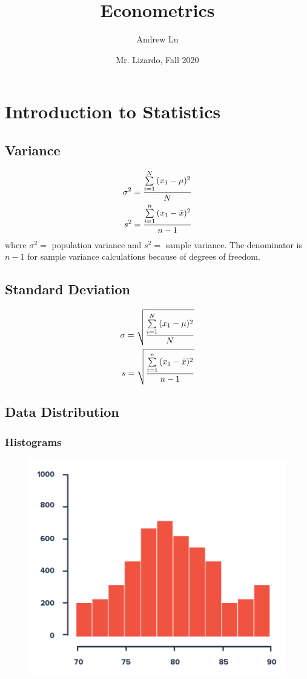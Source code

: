 \documentclass[12pt]{article}
\title{Econometrics}
\author{Andrew Lu}
\date{Mr. Lizardo, Fall 2020}
\numberwithin{equation}{section}
\begin{document}
    \maketitle
    \label{sec:top}
    \tableofcontents

\section{Introduction to Statistics}

\subsection{Variance}
\begin{align}
    \sigma^2=\frac{\sum\limits_{i=1}^{N}{(x_1-\mu)^2}}{N} \\
    s^2=\frac{\sum\limits_{i=1}^{n}{(x_1-\Bar{x})^2}}{n-1}
\end{align}
where $\sigma^2=$ population variance and $s^2=$ sample variance. The denominator is $n-1$ for sample variance calculations because of degrees of freedom.

\subsection{Standard Deviation}
\begin{align}
    \sigma=\sqrt{\frac{\sum\limits_{i=1}^{N}{(x_1-\mu)^2}}{N}} \\
    s=\sqrt{\frac{\sum\limits_{i=1}^{n}{(x_1-\Bar{x})^2}}{n-1}}
\end{align}

\subsection{Data Distribution}
\subsubsection{Histograms}
\begin{figure}[!ht]
    \centering
    \includegraphics[width=0.6\linewidth]{figures/histogram.png}
\end{figure}
\end{document}
